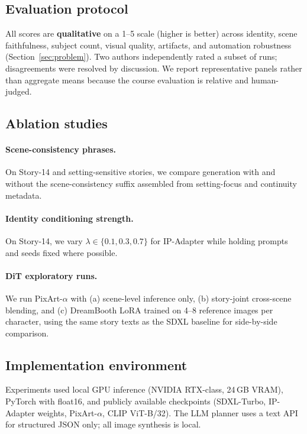 \subsection{Evaluation protocol}
All scores are \textbf{qualitative} on a 1--5 scale (higher is better) across identity, scene faithfulness, subject count, visual quality, artifacts, and automation robustness (Section~\ref{sec:problem}).
Two authors independently rated a subset of runs; disagreements were resolved by discussion.
We report representative panels rather than aggregate means because the course evaluation is relative and human-judged.

\subsection{Ablation studies}
\label{sec:ablations}

\paragraph{Scene-consistency phrases.}
On Story-14 and setting-sensitive stories, we compare generation with and without the scene-consistency suffix assembled from setting-focus and continuity metadata.

\paragraph{Identity conditioning strength.}
On Story-14, we vary $\lambda \in \{0.1, 0.3, 0.7\}$ for IP-Adapter while holding prompts and seeds fixed where possible.

\paragraph{DiT exploratory runs.}
We run PixArt-$\alpha$ with (a) scene-level inference only, (b) story-joint cross-scene blending, and (c) DreamBooth LoRA trained on 4--8 reference images per character, using the same story texts as the SDXL baseline for side-by-side comparison.

\subsection{Implementation environment}
Experiments used local GPU inference (NVIDIA RTX-class, 24\,GB VRAM), PyTorch with float16, and publicly available checkpoints (SDXL-Turbo, IP-Adapter weights, PixArt-$\alpha$, CLIP ViT-B/32).
The LLM planner uses a text API for structured JSON only; all image synthesis is local.
